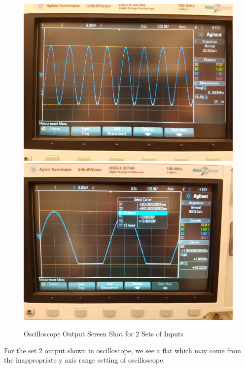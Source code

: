 \documentclass[letterpaper]{article}
\begin{document}
\begin{figure}[H]
	\centering
	\includegraphics[scale=0.1]{osc_set1.jpg}
	\includegraphics[scale=0.1]{osc_set2.jpg}
	\caption{Oscilloscope Output Screen Shot for 2 Sets of Inputs}
	\label{fig:scss}
\end{figure}
For the set $2$ output shown in oscilloscope, we see a flat which may come from the inappropriate y axis range setting of oscilloscope.
\end{document}
